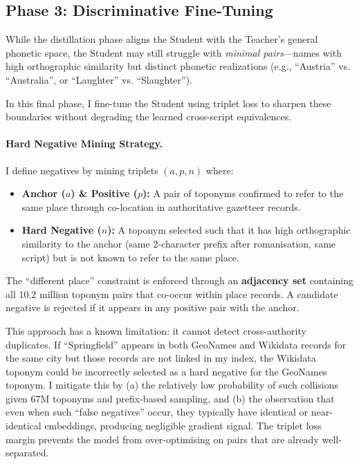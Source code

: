\documentclass[11pt,a4paper]{article}
\begin{document}
\subsection{Phase 3: Discriminative Fine-Tuning}
\label{subsec:phase3}

While the distillation phase aligns the Student with the Teacher's general phonetic space, the Student may still struggle with \emph{minimal pairs}---names with high orthographic similarity but distinct phonetic realizations (e.g., ``Austria'' vs. ``Australia'', or ``Laughter'' vs. ``Slaughter'').

In this final phase, I fine-tune the Student using triplet loss to sharpen these boundaries without degrading the learned cross-script equivalences.

\paragraph{Hard Negative Mining Strategy.}
I define negatives by mining triplets $(a, p, n)$ where:
\begin{itemize}
    \item \textbf{Anchor ($a$) \& Positive ($p$):} A pair of toponyms confirmed to refer to the same place through co-location in authoritative gazetteer records.
    \item \textbf{Hard Negative ($n$):} A toponym selected such that it has high orthographic similarity to the anchor (same 2-character prefix after romanisation, same script) but is not known to refer to the same place.
\end{itemize}

The ``different place'' constraint is enforced through an \textbf{adjacency set} containing all 10.2 million toponym pairs that co-occur within place records. A candidate negative is rejected if it appears in any positive pair with the anchor.

This approach has a known limitation: it cannot detect cross-authority duplicates. If ``Springfield'' appears in both GeoNames and Wikidata records for the same city but those records are not linked in my index, the Wikidata toponym could be incorrectly selected as a hard negative for the GeoNames toponym. I mitigate this by (a) the relatively low probability of such collisions given 67M toponyms and prefix-based sampling, and (b) the observation that even when such ``false negatives'' occur, they typically have identical or near-identical embeddings, producing negligible gradient signal. The triplet loss margin prevents the model from over-optimising on pairs that are already well-separated.
\end{document}
